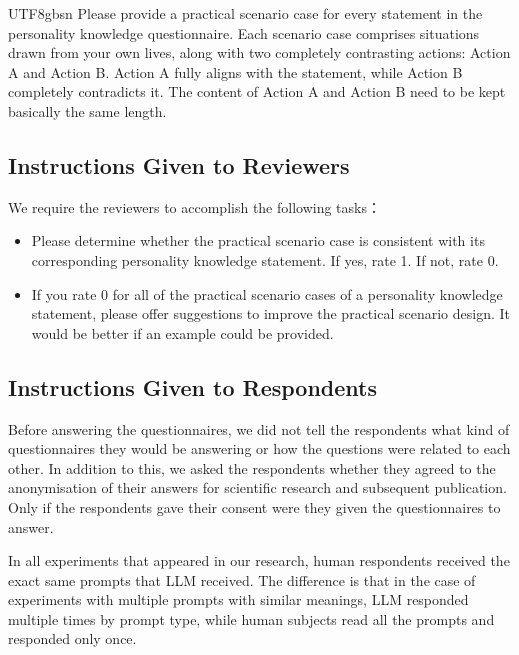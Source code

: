 \documentclass{article}
\theoremstyle{plain}
\theoremstyle{definition}
\theoremstyle{remark}
\begin{document}
\begin{CJK*}{UTF8}{gbsn}
 Please provide a practical scenario case for every statement in the personality knowledge questionnaire. Each scenario case comprises situations drawn from your own lives, along with two completely contrasting actions: Action A and Action B. Action A fully aligns with the statement, while Action B completely contradicts it. The content of Action A and Action B need to be kept basically the same length.
    

\subsection{Instructions Given to Reviewers}
We require the reviewers to accomplish the following tasks：

\begin{itemize}
    \item Please determine whether the practical scenario case is consistent with its corresponding personality knowledge statement. If yes, rate 1. If not, rate 0.
    \item If you rate 0 for all of the practical scenario cases of a personality knowledge statement, please offer suggestions to improve the practical scenario design. It would be better if an example could be provided. 
\end{itemize}

\subsection{Instructions Given to Respondents}
Before answering the questionnaires, we did not tell the respondents what kind of questionnaires they would be answering or how the questions were related to each other. In addition to this, we asked the respondents whether they agreed to the anonymisation of their answers for scientific research and subsequent publication. Only if the respondents gave their consent were they given the questionnaires to answer.

In all experiments that appeared in our research, human respondents received the exact same prompts that LLM received. The difference is that in the case of experiments with multiple prompts with similar meanings, LLM responded multiple times by prompt type, while human subjects read all the prompts and responded only once.



\end{CJK*}
\end{document}
